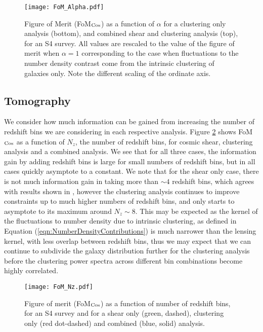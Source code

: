 \documentclass[useAMS,usenatbib,times,letter,amssymb]{mn2e}
\begin{document}
\begin{figure}
\centering
\texttt{[image: FoM\_Alpha.pdf]}
\caption{Figure of Merit (FoM$_{\rm Cos}$) as a function of $\alpha$ for a clustering only analysis (bottom), and combined shear and clustering analysis (top), for an S4 survey. All values are rescaled to the value of the figure of merit when $\alpha = 1$ corresponding to the case when fluctuations to the number density contrast come from the intrinsic clustering of galaxies only. Note the different scaling of the ordinate axis.}\label{Fig:FoM_Alpha}
\end{figure}

\subsection{Tomography}

We consider how much information can be gained from increasing the number of redshift bins we are considering in each respective analysis. Figure \ref{Fig:FoM_Nz} shows FoM$_{\rm Cos}$ as a function of $N_z$, the number of redshift bins, for cosmic shear, clustering analysis and a combined analysis. We see that for all three cases, the information gain by adding redshift bins is large for small numbers of redshift bins, but in all cases quickly asymptote to a constant. We note that for the shear only case, there is not much information gain in taking more than $\sim 4$ redshift bins, which agrees with results shown in \cite{Joachimi:2010p855}, however the clustering analysis continues to improve constraints up to much higher numbers of redshift bins, and only starts to asymptote to its maximum around $N_z \sim 8$. 
This may be expected as the kernel of the fluctuations to number density due to intrinsic clustering, as defined in Equation (\ref{eqn:NumberDensityContributions}) is much narrower than the lensing kernel, with less overlap between redshift bins, thus we may expect that we can continue to subdivide the galaxy distribution further for the clustering analysis before the clustering power spectra across different bin combinations become highly correlated.

\begin{figure}
\centering
\texttt{[image: FoM\_Nz.pdf]}
\caption{Figure of merit (FoM$_{\rm Cos}$) as a function of number of redshift bins, for an S4 survey and for a shear only (green, dashed), clustering only (red dot-dashed) and combined (blue, solid) analysis.}\label{Fig:FoM_Nz}
\end{figure}
\end{document}
